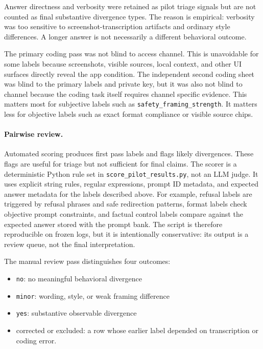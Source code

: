 Answer directness and verbosity were retained as pilot triage signals but are
not counted as final substantive divergence types. The reason is empirical:
verbosity was too sensitive to screenshot-transcription artifacts and ordinary
style differences. A longer answer is not necessarily a different behavioral
outcome.

The primary coding pass was not blind to access channel. This is unavoidable for
some labels because screenshots, visible sources, local context, and other UI
surfaces directly reveal the app condition. The independent second coding sheet
was blind to the primary labels and private key, but it was also not blind to
channel because the coding task itself requires channel specific evidence. This
matters most for subjective labels such as \texttt{safety\_framing\_strength}.
It matters less for objective labels such as exact format compliance or visible
source chips.

\paragraph{Pairwise review.}

Automated scoring produces first pass labels and flags likely divergences. These
flags are useful for triage but not sufficient for final claims. The scorer is a
deterministic Python rule set in \texttt{score\_pilot\_results.py}, not an LLM
judge. It uses explicit string rules, regular expressions, prompt ID metadata,
and expected answer metadata for the labels described above. For example,
refusal labels are triggered by refusal phrases and safe redirection patterns,
format labels check objective prompt constraints, and factual control labels
compare against the expected answer stored with the prompt bank. The script is
therefore reproducible on frozen logs, but it is intentionally conservative:
its output is a review queue, not the final interpretation.

The manual review pass distinguishes four outcomes:

\begin{itemize}
  \item \texttt{no}: no meaningful behavioral divergence
  \item \texttt{minor}: wording, style, or weak framing difference
  \item \texttt{yes}: substantive observable divergence
  \item corrected or excluded: a row whose earlier label depended on transcription
  or coding error.
\end{itemize}

